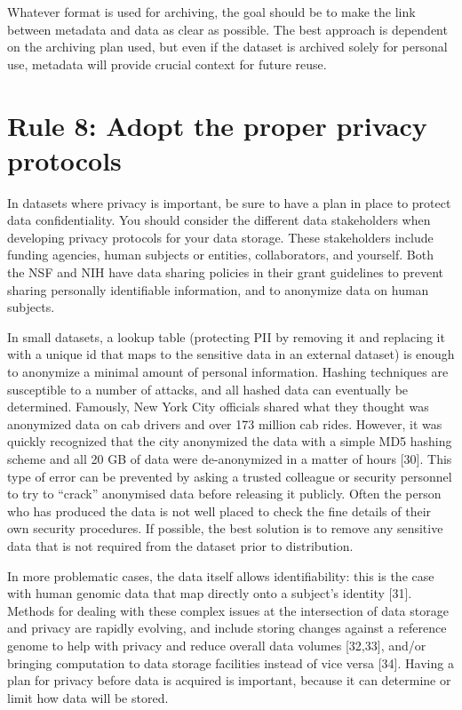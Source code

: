 \documentclass[10pt,letterpaper]{article}
\begin{document}
Whatever format is used for archiving, the goal should be to make the
link between metadata and data as clear as possible. The best approach
is dependent on the archiving plan used, but even if the dataset is
archived solely for personal use, metadata will provide crucial context
for future reuse.

\section*{Rule 8: Adopt the proper privacy
protocols}\label{rule-8-adopt-the-proper-privacy-protocols}

In datasets where privacy is important, be sure to have a plan in place
to protect data confidentiality. You should consider the different data
stakeholders when developing privacy protocols for your data storage.
These stakeholders include funding agencies, human subjects or entities,
collaborators, and yourself. Both the NSF and NIH have data sharing
policies in their grant guidelines to prevent sharing personally
identifiable information, and to anonymize data on human subjects.

In small datasets, a lookup table (protecting PII by removing it and
replacing it with a unique id that maps to the sensitive data in an
external dataset) is enough to anonymize a minimal amount of personal
information. Hashing techniques are susceptible to a number of attacks,
and all hashed data can eventually be determined. Famously, New York
City officials shared what they thought was anonymized data on cab
drivers and over 173 million cab rides. However, it was quickly
recognized that the city anonymized the data with a simple MD5 hashing
scheme and all 20 GB of data were de-anonymized in a matter of hours
{[}30{]}. This type of error can be prevented by asking a trusted
colleague or security personnel to try to ``crack'' anonymised data
before releasing it publicly. Often the person who has produced the data
is not well placed to check the fine details of their own security
procedures. If possible, the best solution is to remove any sensitive
data that is not required from the dataset prior to distribution.

In more problematic cases, the data itself allows identifiability: this
is the case with human genomic data that map directly onto a subject's
identity {[}31{]}. Methods for dealing with these complex issues at the
intersection of data storage and privacy are rapidly evolving, and
include storing changes against a reference genome to help with privacy
and reduce overall data volumes {[}32,33{]}, and/or bringing computation
to data storage facilities instead of vice versa {[}34{]}. Having a plan
for privacy before data is acquired is important, because it can
determine or limit how data will be stored.
\end{document}
